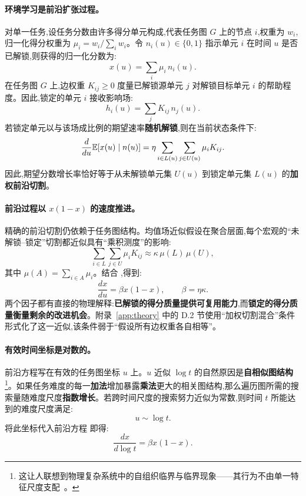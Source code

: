 \paragraph{环境学习是前沿扩张过程。} 对单一任务,设任务分数由许多得分单元构成,代表任务图 $G$ 上的节点 $i$,权重为 $w_{i}$,归一化得分权重为 $\mu_{i} = w_{i}/\sum_{i} w_{i}$。令 $n_{i}(u) \in \{0,1\}$ 指示单元 $i$ 在时间 $u$ 是否已解锁,则获得的归一化分数为:
\[
    x(u) = \sum_{i} \mu_{i}\,n_{i}(u).
\]
在任务图 $G$ 上,边权重 $K_{ij} \geq 0$ 度量已解锁源单元 $j$ 对解锁目标单元 $i$ 的帮助程度。因此,锁定的单元 $i$ 接收影响场:
\[
    h_{i}(u) = \sum_{j} K_{ij}\,n_{j}(u).
\]
若锁定单元以与该场成比例的期望速率\textbf{随机解锁},则在当前状态条件下:
\begin{equation}
    \frac{d}{du} \mathbb{E}[x(u) \mid n(u)] = \eta \sum_{i \in L(u)} \sum_{j \in U(u)} \mu_{i} K_{ij}.
    \label{eq:frontier}
\end{equation}
因此,期望分数增长率恰好等于从未解锁单元集 $U(u)$ 到锁定单元集 $L(u)$ 的\textbf{加权前沿切割}。

\paragraph{前沿过程以 $x(1-x)$ 的速度推进。} 精确的前沿切割仍依赖于任务图结构。均值场近似假设在聚合层面,每个宏观的``未解锁--锁定''切割都近似具有``乘积测度''的影响:
\[
    \sum_{i \in L}\sum_{j \in U} \mu_{i} K_{ij} \approx \kappa\, \mu(L)\,\mu(U),
\]
其中 $\mu(A) = \sum_{i \in A} \mu_{i}$。结合 ,得到:
\begin{equation}
    \frac{dx}{du} = \beta x(1-x), \qquad \beta = \eta \kappa.
    \label{eq:logistic}
\end{equation}
两个因子都有直接的物理解释:\textbf{已解锁的得分质量提供可复用能力},而\textbf{锁定的得分质量衡量剩余的改进机会}。附录~\ref{app:theory} 中的 D.2 节使用``加权切割混合''条件形式化了这一近似,该条件弱于``假设所有边权重各自相等''。

\paragraph{有效时间坐标是对数的。} 前沿方程写在有效的任务图坐标 $u$ 上。$u$ 近似 $\log t$ 的自然原因是\textbf{自相似图结构}\footnote{这让人联想到物理复杂系统中的自组织临界与临界现象——其行为不由单一特征尺度支配~\cite{bak1987self,newman2005power}。}。如果任务难度的每一\textbf{加法}增加暴露\textbf{乘法}更大的相关图结构,那么遍历图所需的搜索量随难度尺度\textbf{指数增长}。若跨时间尺度的搜索努力近似为常数,则时间 $t$ 所能达到的难度尺度满足:
\[
    u \sim \log t.
\]
将此坐标代入前沿方程  即得:
\begin{equation}
    \frac{dx}{d\log t} = \beta x(1-x).
    \label{eq:logistic-log}
\end{equation}

